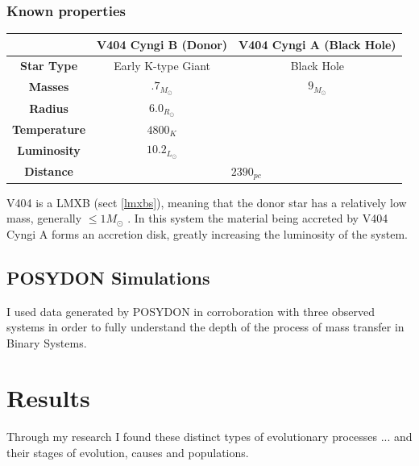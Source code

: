 \documentclass[12pt, letterpaper]{article}
\begin{document}
        \subsubsection{Known properties}
        \begin{center}
            \begin{tabular}{||c | c c||} 
             \hline
             & \textbf{V404 Cyngi B (Donor)} & \textbf{V404 Cyngi A (Black Hole)} \\ 
             \hline\hline
             \textbf{Star Type} & Early K-type Giant & Black Hole \\ 
             \hline
             \textbf{Masses}& $.7_{M_\odot}$ \cite{Bernardini_2016} & $9_{M_\odot}$ \cite{Shahbaz_1994} \\
             \hline
             \textbf{Radius} & $6.0_{R_\odot}$ \cite{Shahbaz_1994} &  \\
             \hline
             \textbf{Temperature} & $4800_K$ \cite{Shahbaz_1994} & \\
             \hline
             \textbf{Luminosity} & $10.2_{L_\odot}$ \cite{Shahbaz_1994} &  \\ 
             \hline
             \textbf{Distance} & \multicolumn{2}{c||}{$2390_{pc}$ \cite{Bernardini_2016}} \\
             \hline
        \end{tabular} 
        \end{center}

        V404 is a LMXB (sect \ref{lmxbs}), meaning that the donor star has a relatively low mass, generally $\leq 1 M_\odot$ \cite{Bahramian_2023}. In this system the material being accreted by V404 Cyngi A forms an accretion disk, greatly increasing the luminosity of the system.
        
    \subsection{POSYDON Simulations}
         I used data generated by POSYDON \cite{Fragos_2023} in corroboration with three observed systems in order to fully understand the depth of the process of mass transfer in Binary Systems.
    \cite{TaurisvandenHeuvel+2023}


\section{\centering Results}
    Through my research I found these distinct types of evolutionary processes ... and their stages of evolution, causes and populations. 
    
\end{document}
